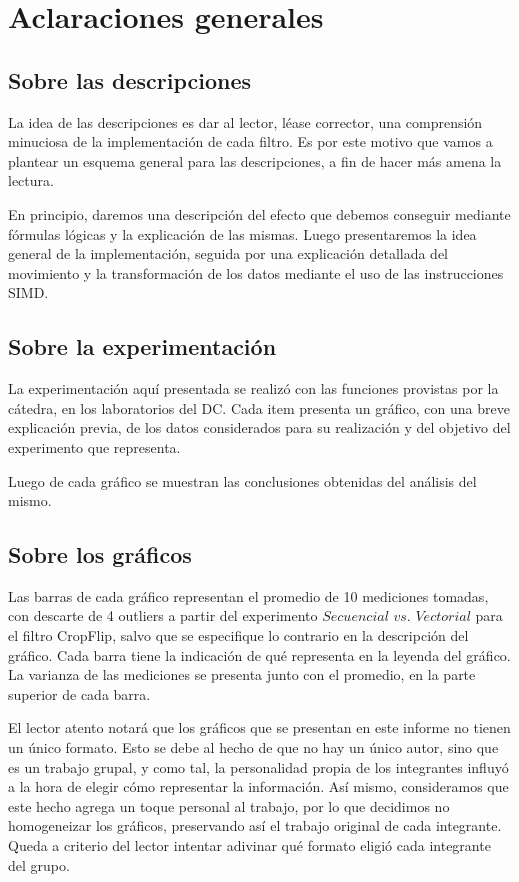 \section{Aclaraciones generales}

\subsection{Sobre las descripciones}

La idea de las descripciones es dar al lector, l\'ease corrector, una comprensi\'on minuciosa de la implementaci\'on de cada filtro. Es por este 
motivo que vamos a plantear un esquema general para las descripciones, a fin de hacer m\'as amena la lectura. 

En principio, daremos una descripci\'on del efecto que debemos conseguir mediante f\'ormulas l\'ogicas y la explicaci\'on de las mismas. Luego presentaremos la idea general de la 
implementaci\'on, seguida por una explicaci\'on detallada del movimiento y la transformaci\'on de los datos mediante el uso de las instrucciones SIMD.

\subsection{Sobre la experimentaci\'on}

La experimentaci\'on aqu\'{i} presentada se realiz\'{o} con las funciones provistas por la c\'{a}tedra, en los laboratorios del DC. Cada item presenta un gr\'{a}fico, 
con una breve explicaci\'{o}n previa, de los datos considerados para su realizaci\'{o}n y del objetivo del experimento que representa. 
 
 Luego de cada gr\'{a}fico se muestran las conclusiones obtenidas del an\'{a}lisis del mismo. 
 
\subsection{Sobre los gr\'{a}ficos}

Las barras de cada gr\'{a}fico representan el promedio de 10 mediciones tomadas, con descarte de 4 outliers a partir del experimento $Secuencial$ $vs.$ $Vectorial$
para el filtro CropFlip, salvo que se especifique lo contrario en la descripci\'on del gr\'afico. Cada barra tiene la indicaci\'{o}n de qu\'{e} representa 
en la leyenda del gr\'{a}fico. La varianza de las mediciones se presenta junto con el promedio, en la parte superior de cada barra.

El lector atento notar\'a que los gr\'aficos que se presentan en este informe no tienen un \'unico formato. Esto se debe al hecho de que no hay un \'unico autor,
sino que es un trabajo 
grupal, y como tal, la personalidad propia de los integrantes influy\'o a la hora de elegir c\'omo representar la informaci\'on. As\'i mismo, consideramos que este 
hecho agrega un toque
personal al trabajo, por lo que decidimos no homogeneizar los gr\'aficos, preservando as\'i el trabajo original de cada integrante. Queda a criterio del lector 
intentar adivinar 
qu\'e formato eligi\'o cada integrante del grupo.


